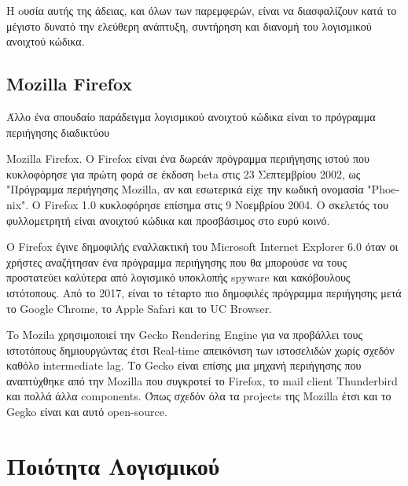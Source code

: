 \documentclass[a4paper, 11pt]{article}
\begin{document}
{H oυσία αυτής της άδειας, και όλων των παρεμφερών, είναι να διασφαλίζουν κατά το μέγιστο δυνατό την ελεύθερη ανάπτυξη, συντήρηση και διανομή του λογισμικού ανοιχτού κώδικα.





\subsection{\textlatin{Mozilla Firefox}}
\indent Άλλο ένα σπουδαίο παράδειγμα λογισμικού ανοιχτού κώδικα είναι το πρόγραμμα περιήγησης διαδικτύου {\textlatin{Mozilla Firefox}. Ο \textlatin{Firefox} είναι ένα δωρεάν πρόγραμμα περιήγησης ιστού που κυκλοφόρησε για πρώτη φορά σε έκδοση beta στις 23 Σεπτεμβρίου 2002, ως "Πρόγραμμα περιήγησης \textlatin{Mozilla}, αν και εσωτερικά είχε την κωδική ονομασία \textlatin{"Phoenix"}. Ο \textlatin{Firefox} 1.0 κυκλοφόρησε επίσημα στις 9 Νοεμβρίου 2004. O σκελετός του φυλλομετρητή είναι ανοιχτού κώδικα και προσβάσιμος στο ευρύ κοινό.

Ο \textlatin{Firefox} έγινε δημοφιλής εναλλακτική του \textlatin{Microsoft Internet Explorer} 6.0 όταν οι χρήστες αναζήτησαν ένα πρόγραμμα περιήγησης που θα μπορούσε να τους προστατεύει καλύτερα από λογισμικό υποκλοπής spyware και κακόβουλους ιστότοπους. Από το 2017, είναι το τέταρτο πιο δημοφιλές πρόγραμμα περιήγησης μετά το \textlatin{Google Chrome}, το \textlatin{Apple Safari} και το \textlatin{UC Browser.}

To  \textlatin{Mozila} χρησιμοποιεί την  \textlatin{Gecko Rendering Engine} για να προβάλλει τους ιστοτόπους δημιουργώντας έτσι  \textlatin{Real-time} απεικόνιση των ιστοσελιδών χωρίς σχεδόν καθόλο  \textlatin{intermediate lag}. Το  \textlatin{Gecko} είναι επίσης μια μηχανή περιήγησης που αναπτύχθηκε από την  \textlatin{Mozilla} που συγκροτεί το  \textlatin{Firefox}, το  \textlatin{mail client Thunderbird} και πολλά άλλα  \textlatin{components}. Όπως σχεδόν όλα τα  \textlatin{projects} της  \textlatin{Mozilla} έτσι και το  \textlatin{Gegko} είναι και αυτό  \textlatin{open-source}.




\section{Ποιότητα Λογισμικού}
}}
\end{document}
